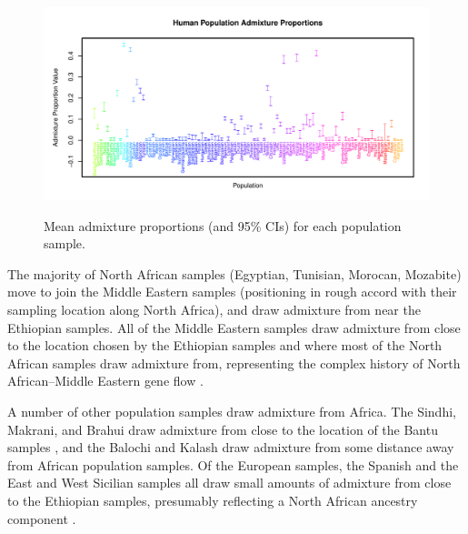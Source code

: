 \documentclass[12pt]{article}
\begin{document}
\begin{figure}
			{\includegraphics[width=\textwidth,height=0.45\textwidth]{figs/globetrotter/globe_adprop.pdf}}
	\caption{Mean admixture proportions (and 95\% CIs) for each population sample.
	\label{globe_ad_props}
    }
\end{figure}
The majority of North African samples (Egyptian, Tunisian, Morocan, Mozabite) move to join the Middle Eastern samples (positioning in rough accord with their sampling location along North Africa), and draw admixture from near the Ethiopian samples. All of the Middle Eastern samples draw admixture from close to the location chosen by the Ethiopian samples and where most of the North African samples draw admixture from, representing the complex history of North African--Middle Eastern gene flow \citep{henn_genomic_2012,Hellenthal}. 

A number of other population samples draw admixture from Africa. The Sindhi, Makrani, and Brahui draw admixture from close to the location of the Bantu samples \citep{Hellenthal}, and the Balochi and Kalash draw admixture from some distance away from African population samples.  Of the European samples, the Spanish and the East and West Sicilian samples all draw small amounts of admixture from close to the Ethiopian samples, presumably reflecting a North African ancestry component \citep{moorjani_history_2011,botigue_gene_2013}. 
\end{document}
